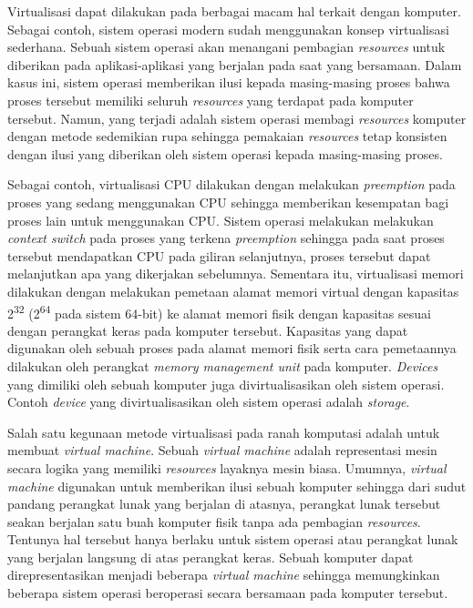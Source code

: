 Virtualisasi dapat dilakukan pada berbagai macam hal terkait dengan komputer.  Sebagai contoh,
sistem operasi modern sudah menggunakan konsep virtualisasi sederhana.  Sebuah sistem operasi
akan menangani pembagian \textit{resources} untuk diberikan pada aplikasi-aplikasi yang
berjalan pada saat yang bersamaan. Dalam kasus ini, sistem operasi memberikan ilusi kepada
masing-masing proses bahwa proses tersebut memiliki seluruh \textit{resources} yang terdapat
pada komputer tersebut. Namun, yang terjadi adalah sistem operasi membagi \textit{resources}
komputer dengan metode sedemikian rupa sehingga pemakaian \textit{resources} tetap konsisten
dengan ilusi yang diberikan oleh sistem operasi kepada masing-masing proses.

Sebagai contoh, virtualisasi CPU dilakukan dengan melakukan \textit{preemption} pada proses yang
sedang menggunakan CPU sehingga memberikan kesempatan bagi proses lain untuk menggunakan CPU.
Sistem operasi melakukan melakukan \textit{context switch} pada proses yang terkena
\textit{preemption} sehingga pada saat proses tersebut mendapatkan CPU pada giliran selanjutnya,
proses tersebut dapat melanjutkan apa yang dikerjakan sebelumnya.  Sementara itu, virtualisasi
memori dilakukan dengan melakukan pemetaan alamat memori virtual dengan kapasitas
2\textsuperscript{32} (2\textsuperscript{64} pada sistem 64-bit) ke alamat memori fisik dengan
kapasitas sesuai dengan perangkat keras pada komputer tersebut.  Kapasitas yang dapat digunakan
oleh sebuah proses pada alamat memori fisik serta cara pemetaannya dilakukan oleh perangkat
\textit{memory management unit} pada komputer.  \textit{Devices} yang dimiliki oleh sebuah
komputer juga divirtualisasikan oleh sistem operasi.  Contoh \textit{device} yang
divirtualisasikan oleh sistem operasi adalah \textit{storage}.

Salah satu kegunaan metode virtualisasi pada ranah komputasi adalah untuk membuat
\textit{virtual machine}.  Sebuah \textit{virtual machine} adalah representasi mesin secara
logika yang memiliki \textit{resources} layaknya mesin biasa.  Umumnya, \textit{virtual machine}
digunakan untuk memberikan ilusi sebuah komputer sehingga dari sudut pandang perangkat lunak
yang berjalan di atasnya, perangkat lunak tersebut seakan berjalan satu buah komputer fisik
tanpa ada pembagian \textit{resources}.  Tentunya hal tersebut hanya berlaku untuk sistem
operasi atau perangkat lunak yang berjalan langsung di atas perangkat keras.  Sebuah komputer
dapat direpresentasikan menjadi beberapa \textit{virtual machine} sehingga memungkinkan beberapa
sistem operasi beroperasi secara bersamaan pada komputer tersebut.

